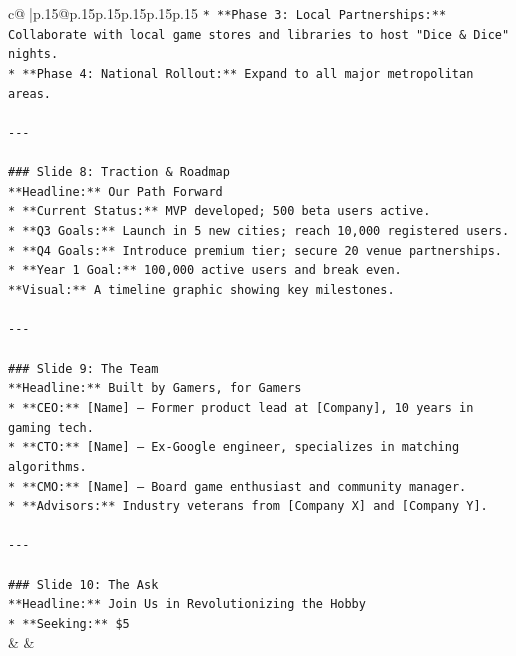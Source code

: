 \documentclass{article}
\begin{document}
{\begin{supertabular}{c@{$\;$}|p{.15\linewidth}@{}p{.15\linewidth}p{.15\linewidth}p{.15\linewidth}p{.15\linewidth}p{.15\linewidth}}
{{{\texttt{*   **Phase 3: Local Partnerships:** Collaborate with local game stores and libraries to host "Dice \& Dice" nights.} \\
\texttt{*   **Phase 4: National Rollout:** Expand to all major metropolitan areas.} \\
\\ 
\texttt{{-}{-}{-}} \\
\\ 
\texttt{\#\#\# Slide 8: Traction \& Roadmap} \\
\texttt{**Headline:** Our Path Forward} \\
\texttt{*   **Current Status:** MVP developed; 500 beta users active.} \\
\texttt{*   **Q3 Goals:** Launch in 5 new cities; reach 10,000 registered users.} \\
\texttt{*   **Q4 Goals:** Introduce premium tier; secure 20 venue partnerships.} \\
\texttt{*   **Year 1 Goal:** 100,000 active users and break even.} \\
\texttt{**Visual:** A timeline graphic showing key milestones.} \\
\\ 
\texttt{{-}{-}{-}} \\
\\ 
\texttt{\#\#\# Slide 9: The Team} \\
\texttt{**Headline:** Built by Gamers, for Gamers} \\
\texttt{*   **CEO:** {[}Name{]} – Former product lead at {[}Company{]}, 10 years in gaming tech.} \\
\texttt{*   **CTO:** {[}Name{]} – Ex{-}Google engineer, specializes in matching algorithms.} \\
\texttt{*   **CMO:** {[}Name{]} – Board game enthusiast and community manager.} \\
\texttt{*   **Advisors:** Industry veterans from {[}Company X{]} and {[}Company Y{]}.} \\
\\ 
\texttt{{-}{-}{-}} \\
\\ 
\texttt{\#\#\# Slide 10: The Ask} \\
\texttt{**Headline:** Join Us in Revolutionizing the Hobby} \\
\texttt{*   **Seeking:** \$5} \\
            }
        }
    }
    & & \\ \\


\end{supertabular}}
\end{document}

